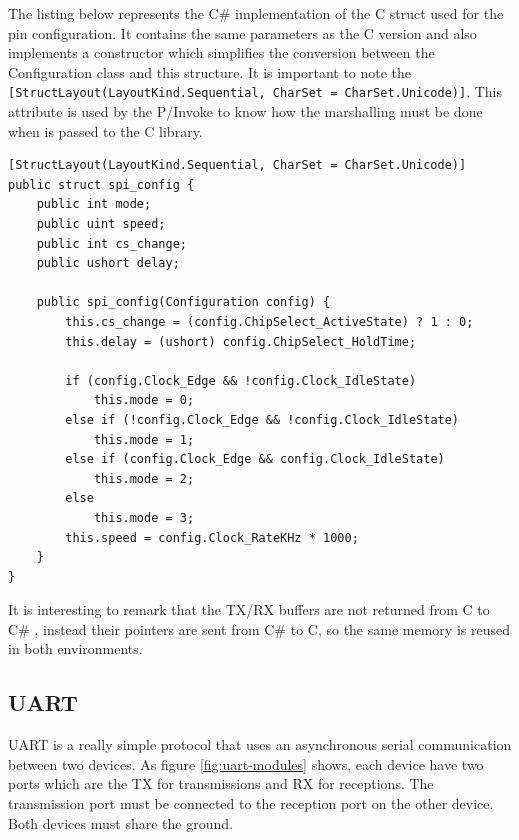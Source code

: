 The listing below represents the C\# implementation of the C struct used for the pin configuration. It contains the same parameters as the C version and also implements a constructor which simplifies the conversion between the Configuration class and this structure. It is important to note the \verb![StructLayout(LayoutKind.Sequential, CharSet = CharSet.Unicode)]!. This attribute is used by the P/Invoke to know how the marshalling must be done when is passed to the C library.

\begin{lstlisting}[language=CSharp, caption={SPI.cs - spi\_config struct}]
[StructLayout(LayoutKind.Sequential, CharSet = CharSet.Unicode)]
public struct spi_config {
    public int mode;
    public uint speed;
    public int cs_change;
    public ushort delay;

    public spi_config(Configuration config) {
        this.cs_change = (config.ChipSelect_ActiveState) ? 1 : 0;
        this.delay = (ushort) config.ChipSelect_HoldTime;

        if (config.Clock_Edge && !config.Clock_IdleState)
            this.mode = 0;
        else if (!config.Clock_Edge && !config.Clock_IdleState)
            this.mode = 1;
        else if (config.Clock_Edge && config.Clock_IdleState)
            this.mode = 2;
        else
            this.mode = 3;
        this.speed = config.Clock_RateKHz * 1000;
    }
}
\end{lstlisting}

It is interesting to remark that the \gls{TX}/\gls{RX} buffers are not returned from C to C\# , instead their pointers are sent from C\# to C, so the same memory is reused in both environments. 

\subsection{UART}\label{SS:IOSharp-UART}
UART is a really simple protocol that uses an asynchronous serial communication between two devices. As figure \ref{fig:uart-modules} shows, each device have two ports which are the \gls{TX} for transmissions and \gls{RX} for receptions. The transmission port must be connected to the reception port on the other device. Both devices must share the ground.


